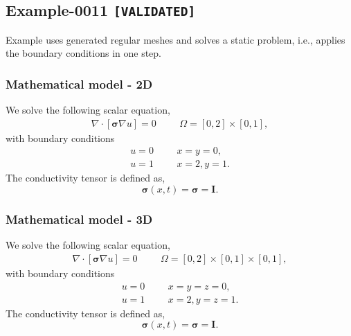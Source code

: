 %
\clearpage
%
\subsection{Example-0011 \texttt{[VALIDATED]}}
%
Example uses generated regular meshes and solves a static problem, i.e., applies
the boundary conditions in one step.
%
%
\subsubsection{Mathematical model - 2D}
%
We solve the following scalar equation,
%
\begin{align}
    \nabla \cdot [\boldsymbol{\sigma} \nabla u] = 0 & &&\Omega = [0, 2] \times [0, 1],
\end{align}
%
with boundary conditions
%
\begin{align}
    u = 0 & &&x = y = 0, \\
    u = 1 & &&x = 2, y = 1.
\end{align}
%
The conductivity tensor is defined as,
%
\begin{equation}
    \boldsymbol{\sigma} (x, t) = \boldsymbol{\sigma} = \boldsymbol{I}.
\end{equation}
%
%
\subsubsection{Mathematical model - 3D}
%
We solve the following scalar equation,
%
\begin{align}
    \nabla \cdot [\boldsymbol{\sigma} \nabla u] = 0 & &&\Omega = [0, 2] \times [0, 1] \times [0, 1],
\end{align}
%
with boundary conditions
%
\begin{align}
    u = 0 & &&x = y = z = 0, \\
    u = 1 & &&x = 2, y = z = 1.
\end{align}
%
The conductivity tensor is defined as,
%
\begin{equation}
    \boldsymbol{\sigma} (x, t) = \boldsymbol{\sigma} = \boldsymbol{I}.
\end{equation}
%
%
